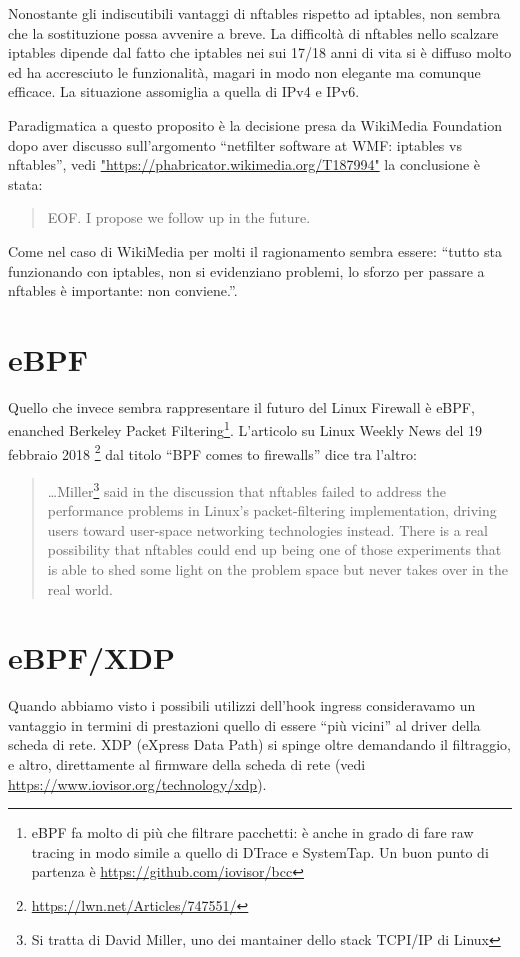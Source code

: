 Nonostante gli indiscutibili vantaggi di nftables rispetto ad iptables, non
sembra che la sostituzione possa avvenire a breve.  La difficolt\`a di nftables
nello scalzare iptables dipende dal fatto che iptables nei sui 17/18 anni di
vita si \`e diffuso molto ed ha accresciuto le funzionalit\`a, magari in modo
non elegante ma comunque efficace. La situazione assomiglia a quella di IPv4 e
IPv6.

Paradigmatica a questo proposito \`e la decisione presa da WikiMedia Foundation
dopo aver discusso sull'argomento ``netfilter software at WMF: iptables vs
nftables'', vedi  \url{"https://phabricator.wikimedia.org/T187994"}
la conclusione \`e stata:
\begin{quote}
    EOF. I propose we follow up in the future.
\end{quote}
Come nel caso di WikiMedia per molti il ragionamento sembra essere: ``tutto sta
funzionando con iptables, non si evidenziano problemi, lo sforzo per passare a
nftables \`e importante: non conviene.''.

\section{eBPF}

Quello che invece sembra rappresentare il futuro del Linux Firewall \`e eBPF,
enanched Berkeley Packet Filtering\footnote{eBPF fa molto di pi\`u che filtrare
pacchetti: \`e anche in grado di fare raw tracing in modo simile a quello di
DTrace e SystemTap. Un buon punto di partenza \`e
\url{https://github.com/iovisor/bcc}}.
L'articolo su Linux Weekly News del 19 febbraio 2018
\footnote{\url{https://lwn.net/Articles/747551/}} dal titolo ``BPF comes to firewalls''
dice tra l'altro:

\begin{quote}
\ldots Miller\footnote{Si tratta di David Miller, uno dei mantainer dello stack
TCPI/IP di Linux} said in the discussion that nftables failed to address the
performance problems in Linux's packet-filtering implementation, driving users
toward user-space networking technologies instead. There is a real possibility
that nftables could end up being one of those experiments that is able to shed
some light on the problem space but never takes over in the real world.
\end{quote}


\section{eBPF/XDP}
Quando abbiamo visto i possibili utilizzi dell'hook ingress consideravamo
un vantaggio in termini di prestazioni quello di essere ``pi\`u vicini'' al
driver della scheda di rete. XDP (eXpress Data Path) si spinge oltre
demandando il filtraggio, e altro, direttamente al firmware della scheda di
rete (vedi \url{https://www.iovisor.org/technology/xdp}).

